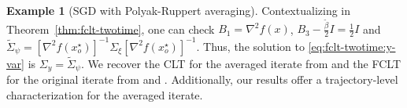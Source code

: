 \documentclass[11pt]{article}
\theoremstyle{plain}
\theoremstyle{definition}
\newtheorem{exam}{Example}[section]
\def\invdiffslow{\tilde{\beta}}
\def\mI{{\bm{I}}}
\newcommand{\xhat}{{\hat{x}}}
\newcommand{\yhat}{{\hat{y}}}
\def\mI{{I}}
\begin{document}
\begin{exam}[SGD with Polyak-Ruppert averaging]
	Contextualizing in Theorem~\ref{thm:fclt-twotime}, one can check 
	$B_1 = \nabla^2 f(x)$, $B_3 - \frac{\invdiffslow }{2} \mI =  \frac{1}{2} \mI $ and $\widetilde{\Sigma}_\psi = [ \nabla^2 f(x_o^\star) ]^{-1} \Sigma_{\xi} [ \nabla^2 f(x_o^\star) ]^{-1} $.
	Thus, the solution to \eqref{eq:fclt-twotime:y-var} is $\Sigma_{y} = \widetilde{\Sigma}_{\psi}$.
	We recover the CLT for the averaged iterate from \cite{polyak1992acceleration} and the FCLT for the original iterate from \cite[Section~II.4.5.3]{benveniste2012adaptive} and \cite[Section~8.4]{borkar2009stochastic}. Additionally, our results offer a trajectory-level characterization for the averaged iterate.
\end{exam}
\end{document}
